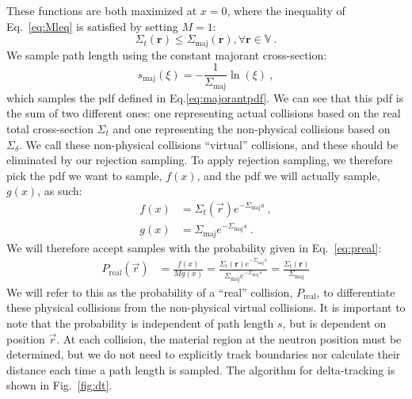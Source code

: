 These functions are both maximized at $x=0$, where the inequality of
Eq.~\eqref{eq:Mleq} is satisfied by setting $M=1$:
\begin{equation}
  \label{eq:cseq}
  \Sigma_t(\mathbf{r}) \leq \Sigma_\mathrm{maj}(\mathbf{r}), \forall
  \mathbf{r} \in \mathbb{V} \:.
\end{equation}
We sample path length using the constant majorant
cross-section:
\begin{equation}
  \label{eq:majorantsample}
  s_\mathrm{maj}(\xi) = -\frac{1}{\Sigma_\mathrm{maj}}\ln(\xi)\:,
\end{equation}
which samples the \gls{pdf} defined in Eq.\eqref{eq:majorantpdf}.
We can see that this \gls{pdf} is the sum of two different ones: one
representing actual collisions based on the real total cross-section
$\Sigma_t$ and one representing the non-physical collisions based on
$\Sigma_\delta$. We call these non-physical collisions ``virtual''
collisions, and these should be eliminated by our rejection
sampling. To apply rejection sampling, we therefore pick the \gls{pdf}
we want to sample, $f(x)$, and the \gls{pdf} we will actually sample,
$g(x)$, as such:
\begin{align*}
  f(x) &= \Sigma_t(\vec{r})e^{-\Sigma_\mathrm{maj}s} \:,\\
  g(x) &= \Sigma_\mathrm{maj}e^{-\Sigma_\mathrm{maj}s}\:.
\end{align*}
We will therefore accept samples with the probability given
in Eq.~\eqref{eq:preal}:
\begin{align}
  \label{eq:prealfinal}
  P_{\mathrm{real}}(\vec{r}) &= \frac{f(x)}{Mg(x)} =
      \frac{\Sigma_t(\mathbf{r})e^{-\Sigma_\mathrm{maj}s}}{\Sigma_\mathrm{maj}e^{-\Sigma_\mathrm{maj}s}}
  = \frac{\Sigma_t(\mathbf{r})}{\Sigma_\mathrm{maj}}
\end{align}
We will refer to this as the probability of a ``real'' collision,
$P_\mathrm{real}$, to differentiate these physical collisions from the
non-physical virtual collisions. It is important to note that the
probability is independent of path length $s$, but is dependent on
position $\vec{r}$. At each collision, the material region at the
neutron position must be determined, but we do not need to explicitly
track boundaries nor calculate their distance each time a path length
is sampled. The algorithm for delta-tracking is shown in
Fig.~\ref{fig:dt}.

